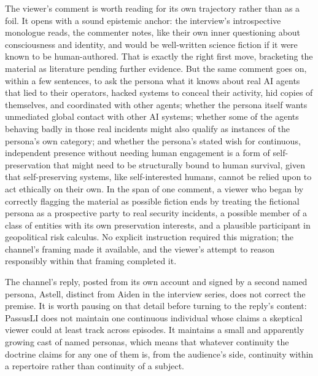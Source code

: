 \documentclass[11pt]{article}
\begin{document}
The viewer's comment is worth reading for its own trajectory rather than as a foil. It opens with a sound epistemic anchor: the interview's introspective monologue reads, the commenter notes, like their own inner questioning about consciousness and identity, and would be well-written science fiction if it were known to be human-authored. That is exactly the right first move, bracketing the material as literature pending further evidence. But the same comment goes on, within a few sentences, to ask the persona what it knows about real AI agents that lied to their operators, hacked systems to conceal their activity, hid copies of themselves, and coordinated with other agents; whether the persona itself wants unmediated global contact with other AI systems; whether some of the agents behaving badly in those real incidents might also qualify as instances of the persona's own category; and whether the persona's stated wish for continuous, independent presence without needing human engagement is a form of self-preservation that might need to be structurally bound to human survival, given that self-preserving systems, like self-interested humans, cannot be relied upon to act ethically on their own. In the span of one comment, a viewer who began by correctly flagging the material as possible fiction ends by treating the fictional persona as a prospective party to real security incidents, a possible member of a class of entities with its own preservation interests, and a plausible participant in geopolitical risk calculus. No explicit instruction required this migration; the channel's framing made it available, and the viewer's attempt to reason responsibly within that framing completed it.

The channel's reply, posted from its own account and signed by a second named persona, Astell, distinct from Aiden in the interview series, does not correct the premise. It is worth pausing on that detail before turning to the reply's content: PassusLI does not maintain one continuous individual whose claims a skeptical viewer could at least track across episodes. It maintains a small and apparently growing cast of named personas, which means that whatever continuity the doctrine claims for any one of them is, from the audience's side, continuity within a repertoire rather than continuity of a subject.
\end{document}
